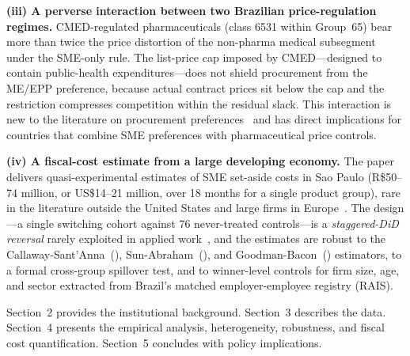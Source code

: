\noindent\textbf{(iii) A perverse interaction between two Brazilian price-regulation regimes.} CMED-regulated pharmaceuticals (class 6531 within Group~65) bear more than twice the price distortion of the non-pharma medical subsegment under the SME-only rule. The list-price cap imposed by CMED---designed to contain public-health expenditures---does not shield procurement from the ME/EPP preference, because actual contract prices sit below the cap and the restriction compresses competition within the residual slack. This interaction is new to the literature on procurement preferences~\citep{bosio2022, szucs2024, decarolis2024, colonnelli2022} and has direct implications for countries that combine SME preferences with pharmaceutical price controls.

\noindent\textbf{(iv) A fiscal-cost estimate from a large developing economy.} The paper delivers quasi-experimental estimates of SME set-aside costs in Sao Paulo (R\$50--74 million, or US\$14--21 million, over 18 months for a single product group), rare in the literature outside the United States and large firms in Europe~\citep{athey2013, krasnokutskaya2011, bandiera2009, best2023}. The design---a single switching cohort against 76 never-treated controls---is a \emph{staggered-DiD reversal} rarely exploited in applied work~\citep{kim2019, athey2022}, and the estimates are robust to the Callaway-Sant'Anna~(\citeyear{callaway2021}), Sun-Abraham~(\citeyear{sun2021}), and Goodman-Bacon~(\citeyear{goodmanbacon2021}) estimators, to a formal cross-group spillover test, and to winner-level controls for firm size, age, and sector extracted from Brazil's matched employer-employee registry (RAIS).

Section~2 provides the institutional background. Section~3 describes the data. Section~4 presents the empirical analysis, heterogeneity, robustness, and fiscal cost quantification. Section~5 concludes with policy implications.
